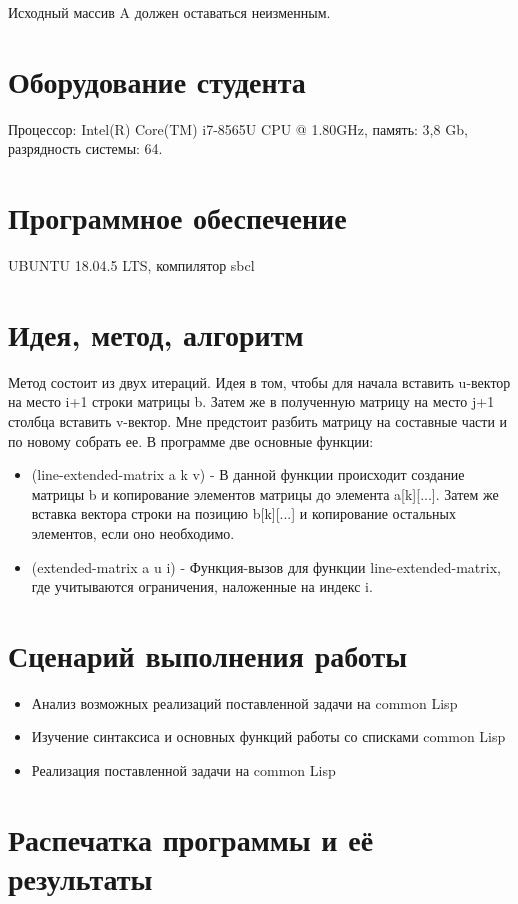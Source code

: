 \documentclass[12pt]{article}
\begin{document}
Исходный массив A должен оставаться неизменным.

\section{Оборудование студента}
Процессор: Intel(R) Core(TM) i7-8565U CPU @ 1.80GHz, память: 3,8 Gb, разрядность системы: 64.

\section{Программное обеспечение}
UBUNTU 18.04.5 LTS, компилятор sbcl

\section{Идея, метод, алгоритм}
Метод состоит из двух итераций. Идея в том, чтобы для начала вставить u-вектор на место i+1 строки матрицы b. Затем же в полученную матрицу на место j+1 столбца вставить v-вектор. Мне предстоит разбить матрицу на составные части и по новому собрать ее. В программе две основные функции:
\begin{itemize}
\setlength{\itemsep}{-1mm} %
\item (line-extended-matrix a k v) - В данной функции происходит создание матрицы b и копирование элементов матрицы до элемента a[k][...]. Затем же вставка вектора строки на позицию b[k][...] и копирование остальных элементов, если оно необходимо.
\item (extended-matrix a u i) - Функция-вызов для функции line-extended-matrix, где учитываются ограничения, наложенные на индекс i.
\end{itemize}

\section{Сценарий выполнения работы}
\begin{itemize}
\setlength{\itemsep}{-1mm}
\item Анализ возможных реализаций поставленной задачи на common Lisp
\item Изучение синтаксиса и основных функций работы со списками common Lisp
\item Реализация поставленной задачи на common Lisp
\end{itemize}

\section{Распечатка программы и её результаты}
\end{document}
